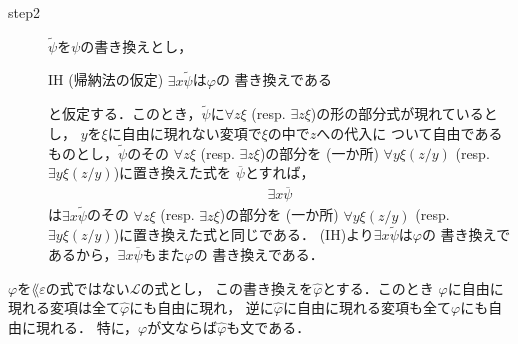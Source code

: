 \begin{metaprf}
\begin{description}
\begin{description}
					\item[step2]
						$\widetilde{\psi}$を$\psi$の書き換えとし，
						\begin{itembox}[l]{IH (帰納法の仮定)}
							$\exists x \widetilde{\psi}$は$\varphi$の
							書き換えである
						\end{itembox}
						と仮定する．このとき，$\widetilde{\psi}$に$\forall z \xi$ 
						(resp. $\exists z \xi$)の形の部分式が現れているとし，
						$y$を$\xi$に自由に現れない変項で$\xi$の中で$z$への代入に
						ついて自由であるものとし，$\widetilde{\psi}$のその
						$\forall z \xi$ (resp. $\exists z \xi$)の部分を
						(一か所) $\forall y \xi(z/y)$
						(resp. $\exists y \xi(z/y)$)に置き換えた式を
						$\overline{\psi}$とすれば，
						\begin{align}
							\exists x \overline{\psi}
						\end{align}
						は$\exists x \widetilde{\psi}$のその
						$\forall z \xi$ (resp. $\exists z \xi$)の部分を
						(一か所) $\forall y \xi(z/y)$
						(resp. $\exists y \xi(z/y)$)に置き換えた式と同じである．
						(IH)より$\exists x \widetilde{\psi}$は$\varphi$の
						書き換えであるから，$\exists x \overline{\psi}$もまた$\varphi$の
						書き換えである．
						\QED
				\end{description}
		\end{description}
	\end{metaprf}
	
	\begin{screen}
		\begin{metathm}[書き換えによって自由な変項は増減しない]
		\label{metathm:variables_unchanged_after_rewriting}
			$\varphi$を$\lang{\varepsilon}$の式ではない$\mathcal{L}$の式とし，
			この書き換えを$\widehat{\varphi}$とする．このとき
			$\varphi$に自由に現れる変項は全て$\widehat{\varphi}$にも自由に現れ，
			逆に$\widehat{\varphi}$に自由に現れる変項も全て$\varphi$にも自由に現れる．
			特に，$\varphi$が文ならば$\widehat{\varphi}$も文である．
		\end{metathm}
	\end{screen}
	
